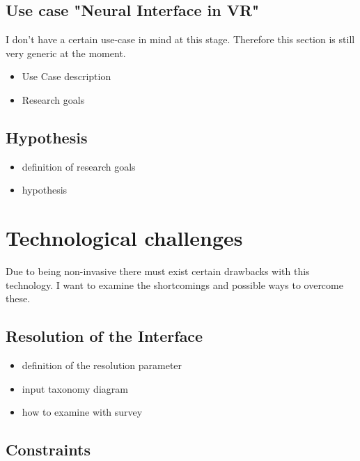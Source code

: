 \documentclass[titlepage, a4paper, 11pt]{scrartcl}
\begin{document}
{        \subsection{Use case "Neural Interface in VR"}

            I don't have a certain use-case in mind at this stage. Therefore this section is still very generic at the moment.

            \begin{itemize}
                \item Use Case description
                \item Research goals
            \end{itemize}        

        \subsection{Hypothesis}

            \begin{itemize}
                \item definition of research goals
                \item hypothesis
            \end{itemize}
        
    \section{Technological challenges}

        Due to being non-invasive there must exist certain drawbacks with this technology. I want to examine the shortcomings and possible ways to overcome these.    

        \subsection{Resolution of the Interface}

            \begin{itemize}
                \item definition of the resolution parameter
                \item input taxonomy diagram
                \item how to examine with survey                                     
            \end{itemize}

        \subsection{Constraints}

}
\end{document}
